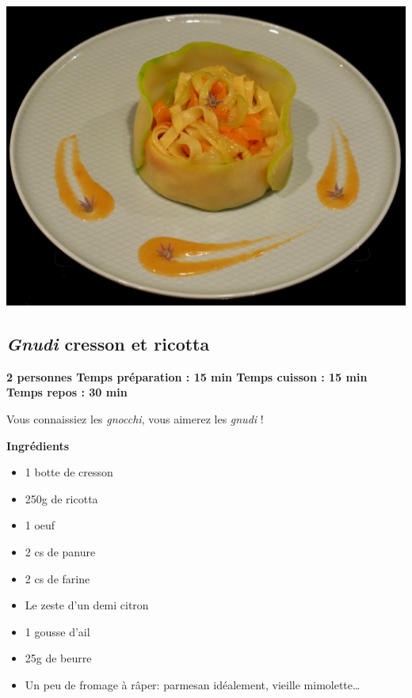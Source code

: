 \documentclass[]{book}
\providecommand{\tightlist}{%
  \setlength{\itemsep}{0pt}\setlength{\parskip}{0pt}}
\begin{document}
\begin{center}\includegraphics[width=0.9\linewidth]{photos/tagliatelles_crevettes} \end{center}

\hypertarget{gnudi-cresson-et-ricotta}{%
\subsection*{\texorpdfstring{{\emph{Gnudi} cresson et ricotta}}{Gnudi cresson et ricotta}}\label{gnudi-cresson-et-ricotta}}

\begin{salebox}
\textbf{2 personnes \textbar{} Temps préparation : 15 min \textbar{}
Temps cuisson : 15 min \textbar{} Temps repos : 30 min}

Vous connaissiez les \emph{gnocchi}, vous aimerez les \emph{gnudi} !
\end{salebox}

\textbf{Ingrédients}

\begin{itemize}
\tightlist
\item
  1 botte de cresson
\item
  250g de ricotta
\item
  1 oeuf
\item
  2 cs de panure
\item
  2 cs de farine
\item
  Le zeste d'un demi citron
\item
  1 gousse d'ail
\item
  25g de beurre
\item
  Un peu de fromage à râper: parmesan idéalement, vieille mimolette\ldots{}
\end{itemize}
\end{document}
